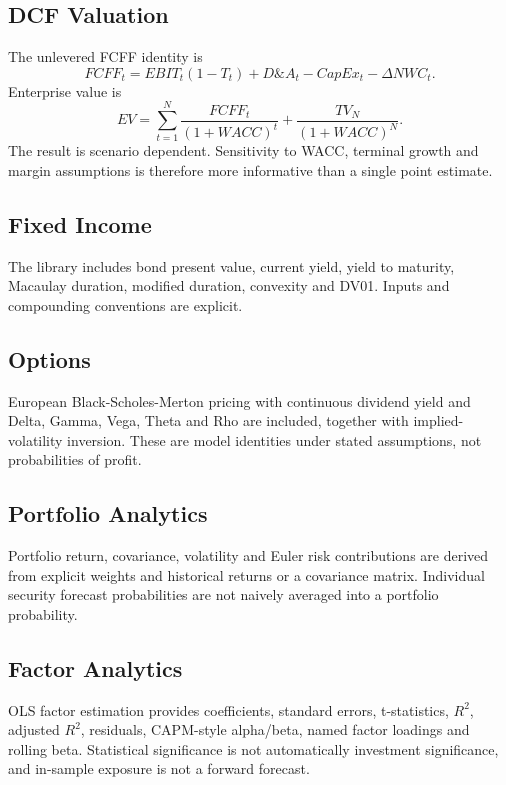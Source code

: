 \documentclass[11pt]{article}
\begin{document}
\subsection{DCF Valuation}
The unlevered FCFF identity is
\begin{equation}
FCFF_t=EBIT_t(1-T_t)+D\&A_t-CapEx_t-\Delta NWC_t.
\end{equation}
Enterprise value is
\begin{equation}
EV=\sum_{t=1}^{N}\frac{FCFF_t}{(1+WACC)^t}+\frac{TV_N}{(1+WACC)^N}.
\end{equation}
The result is scenario dependent. Sensitivity to WACC, terminal growth and margin assumptions is therefore more informative than a single point estimate.

\subsection{Fixed Income}
The library includes bond present value, current yield, yield to maturity, Macaulay duration, modified duration, convexity and DV01. Inputs and compounding conventions are explicit.

\subsection{Options}
European Black-Scholes-Merton pricing with continuous dividend yield and Delta, Gamma, Vega, Theta and Rho are included, together with implied-volatility inversion. These are model identities under stated assumptions, not probabilities of profit.

\subsection{Portfolio Analytics}
Portfolio return, covariance, volatility and Euler risk contributions are derived from explicit weights and historical returns or a covariance matrix. Individual security forecast probabilities are not naively averaged into a portfolio probability.

\subsection{Factor Analytics}
OLS factor estimation provides coefficients, standard errors, t-statistics, $R^2$, adjusted $R^2$, residuals, CAPM-style alpha/beta, named factor loadings and rolling beta. Statistical significance is not automatically investment significance, and in-sample exposure is not a forward forecast.
\end{document}
